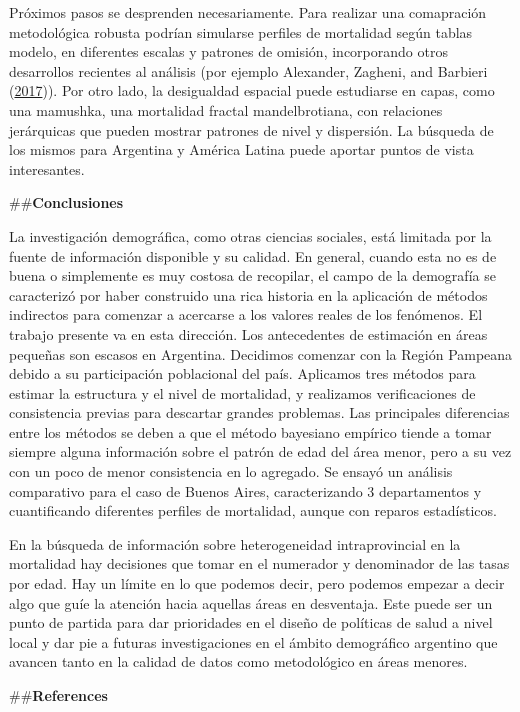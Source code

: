 \documentclass[12pt,]{article}
\begin{document}
Próximos pasos se desprenden necesariamente. Para realizar una
comapración metodológica robusta podrían simularse perfiles de
mortalidad según tablas modelo, en diferentes escalas y patrones de
omisión, incorporando otros desarrollos recientes al análisis (por
ejemplo Alexander, Zagheni, and Barbieri
(\protect\hyperlink{ref-Alexander2017}{2017})). Por otro lado, la
desigualdad espacial puede estudiarse en capas, como una mamushka, una
mortalidad fractal mandelbrotiana, con relaciones jerárquicas que pueden
mostrar patrones de nivel y dispersión. La búsqueda de los mismos para
Argentina y América Latina puede aportar puntos de vista interesantes.

\#\#\textbf{Conclusiones}

La investigación demográfica, como otras ciencias sociales, está
limitada por la fuente de información disponible y su calidad. En
general, cuando esta no es de buena o simplemente es muy costosa de
recopilar, el campo de la demografía se caracterizó por haber construido
una rica historia en la aplicación de métodos indirectos para comenzar a
acercarse a los valores reales de los fenómenos. El trabajo presente va
en esta dirección. Los antecedentes de estimación en áreas pequeñas son
escasos en Argentina. Decidimos comenzar con la Región Pampeana debido a
su participación poblacional del país. Aplicamos tres métodos para
estimar la estructura y el nivel de mortalidad, y realizamos
verificaciones de consistencia previas para descartar grandes problemas.
Las principales diferencias entre los métodos se deben a que el método
bayesiano empírico tiende a tomar siempre alguna información sobre el
patrón de edad del área menor, pero a su vez con un poco de menor
consistencia en lo agregado. Se ensayó un análisis comparativo para el
caso de Buenos Aires, caracterizando 3 departamentos y cuantificando
diferentes perfiles de mortalidad, aunque con reparos estadísticos.

En la búsqueda de información sobre heterogeneidad intraprovincial en la
mortalidad hay decisiones que tomar en el numerador y denominador de las
tasas por edad. Hay un límite en lo que podemos decir, pero podemos
empezar a decir algo que guíe la atención hacia aquellas áreas en
desventaja. Este puede ser un punto de partida para dar prioridades en
el diseño de políticas de salud a nivel local y dar pie a futuras
investigaciones en el ámbito demográfico argentino que avancen tanto en
la calidad de datos como metodológico en áreas menores.

\#\#\textbf{References}
\end{document}
